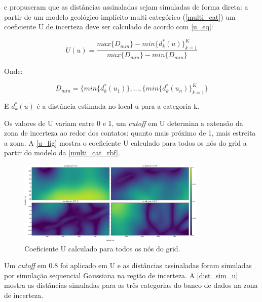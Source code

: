  e \cite{radtke_dissertacao} propuseram que as distâncias assinaladas sejam simuladas de forma direta: a partir de um modelo geológico implícito multi categórico (\autoref{multi_cat}) um coeficiente U de incerteza deve ser calculado de acordo com \autoref{u_eq}:

\begin{equation}\label{u_eq}
    U(u)=\frac{max\{D_{min}\}-min\{d^*_k(u)\}^K_{k=1}}{max\{D_{min}\}-min\{D_{min}\}}
\end{equation}

Onde:

\begin{equation}
    D_{min}=\{min\{d^*_k(u_1)\},...,\{min\{d^*_k(u_n)\}^K_{k=1}\}
\end{equation}

E $d^*_k(u)$ é a distância estimada no local u para a categoria k.

Os valores de U variam entre 0 e 1, um \textit{cutoff} em U determina a extensão da zona de incerteza ao redor dos contatos: quanto mais próximo de 1, mais estreita a zona. A \autoref{u_fig} mostra o coeficiente U calculado para todos os nós do grid a partir do modelo da \autoref{multi_cat_rbf}.

\begin{figure}[H]
	\caption{\label{u_fig}Coeficiente U calculado para todos os nós do grid.}
	\begin{center}
		\includegraphics[width=0.8\textwidth]{capitulo_2/u_coef.png}
	\end{center}
\end{figure}

Um \textit{cutoff} em 0.8 foi aplicado em U e as distâncias assinaladas foram simuladas por simulação sequencial Gaussiana na região de incerteza. A \autoref{dist_sim_u} mostra as distâncias simuladas para as três categorias do banco de dados na zona de incerteza. 

